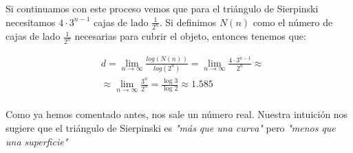 \noindent Si continuamos con este proceso vemos que para el triángulo de Sierpinski necesitamos $4 \cdot 3^{n-1}$ cajas de lado $\frac{1}{2^n}$.
Si definimos $N(n)$ como el número de cajas de lado $\frac{1}{2^n}$ necesarias para cubrir el objeto, entonces tenemos que:

\begin{equation}
    \begin{split}
        & d = \lim_{n \rightarrow \infty} \frac{log (N(n))}{log (2^n)} = \lim_{n \rightarrow \infty} \frac{4 \cdot 3^{n-1}}{2^n} \approx \\
        & \approx \lim_{n \rightarrow \infty} \frac{3^n}{2^n} = \frac{\log{3}}{\log{2}} \approx 1.585\\
    \end{split}
\end{equation}

\noindent Como ya hemos comentado antes, nos sale un número real. Nuestra intuición nos sugiere que el triángulo de Sierpinski es \textit{"más que una curva"} pero \textit{"menos que una superficie"}\\
